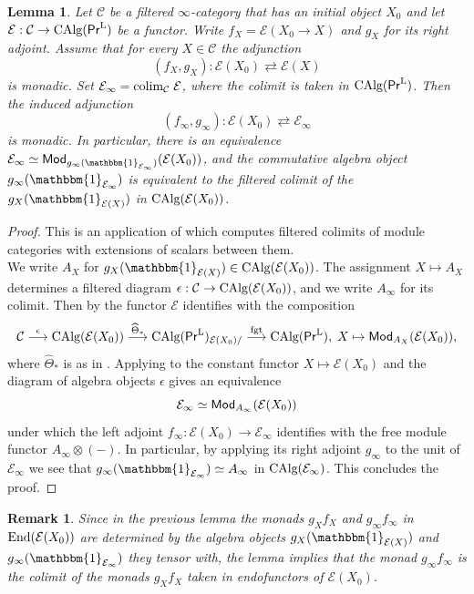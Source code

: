 \documentclass[reqno]{amsart}
\numberwithin{equation}{section}\theoremstyle{thms}
\newtheorem{lem}[equation]{Lemma}
\theoremstyle{defn}
\newtheorem{rem}[equation]{Remark}
\newcommand{\cC}{\mathcal{C}}
\newcommand{\cE}{\mathcal{E}}
\newcommand{\tn}[1]{\textnormal{#1}}
\newcommand{\tsf}[1]{\textsf{\textup{#1}}}
\newcommand{\what}[1]{\widehat{#1}}
\newcommand{\calg}{\tn{CAlg}}
\newcommand{\bbone}{\mathbbm{1}}
\newcommand{\Mod}{\tsf{Mod}}
\newcommand{\prl}{\tsf{Pr}^{\tn{L}}}
\begin{document}
\begin{lem}\label{lem:filteredcolimitofmonadicadjunctions}
Let $\cC$ be a filtered $\infty$-category that has an initial object $X_0$ and let $\cE: \cC \to \calg(\prl)$ be a functor. Write $f_{X} = \cE(X_0 \to X)$ and $g_X$ for its right adjoint. Assume that for every $X \in \cC$ the adjunction 
$$(f_{X},g_{X}): \cE(X_0) \rightleftarrows \cE(X)$$
is monadic. Set $\cE_{\infty} = \tn{colim}_{\cC} \; \cE$, where the colimit is taken in $\calg(\prl)$. Then the induced adjunction
$$(f_{{\infty}},g_{\infty}): \cE(X_0) \rightleftarrows \cE_{\infty}$$
is monadic. In particular, there is an equivalence $\cE_{\infty} \simeq \Mod_{g_{\infty}(\bbone_{\cE_{\infty}})}(\cE(X_0))$, and the commutative algebra object $g_{\infty}(\bbone_{\cE_{\infty}})$ is equivalent to the filtered colimit of the $g_{X}(\bbone_{\cE(X)})$ in $\calg(\cE(X_0))$.
\end{lem}
\begin{proof}
This is an application of \cite[Lemma 3.5.6]{agv22} which computes filtered colimits of module categories with extensions of scalars between them. \\
We write $A_X$ for $g_{X}(\bbone_{\cE(X)}) \in \calg(\cE(X_0))$. The assignment $X \mapsto A_X$ determines a filtered diagram $\epsilon: \cC \to \calg(\cE(X_0))$, and we write $A_{\infty}$ for its colimit. Then by \cite[Theorem 4.8.5.11]{lur17} the functor $\cE$ identifies with the composition
$$\cC \stackrel{\epsilon}{\longrightarrow} \calg(\cE(X_0)) \stackrel{\what{\Theta}_*}{\longrightarrow} \calg(\prl)_{\cE(X_0)/} \stackrel{\tn{fgt}}{\longrightarrow} \calg(\prl), \; X \mapsto \Mod_{A_X}(\cE(X_0)),$$
where $\what{\Theta}_*$ is as in \cite[Notation 4.8.5.10]{lur17}. Applying \cite[Lemma 3.5.6]{agv22} to the constant functor $X \mapsto \cE(X_0)$ and the diagram of algebra objects $\epsilon$ gives an equivalence
$$\cE_{\infty} \simeq \Mod_{A_{\infty}}(\cE(X_0))$$
under which the left adjoint $f_{\infty}: \cE(X_0) \to \cE_{\infty}$ identifies with the free module functor $A_{\infty} \otimes (-)$. In particular, by applying its right adjoint $g_{\infty}$ to the unit of $\cE_{\infty}$ we see that $g_{\infty}(\bbone_{\cE_{\infty}}) \simeq A_{\infty}$ in $\calg(\cE_{\infty})$. This concludes the proof.
\end{proof}

\begin{rem}\label{rem:monads}
Since in the previous lemma the monads $g_Xf_X$ and $g_{\infty}f_{\infty}$ in $\tn{End}(\cE(X_0))$ are determined by the algebra objects $g_{X}(\bbone_{\cE(X)})$ and $g_{\infty}(\bbone_{\cE_{\infty}})$ they tensor with, the lemma implies that the monad $g_{\infty}f_{\infty}$ is the colimit of the monads $g_Xf_X$ taken in endofunctors of $\cE(X_0)$.
\end{rem}
\end{document}
